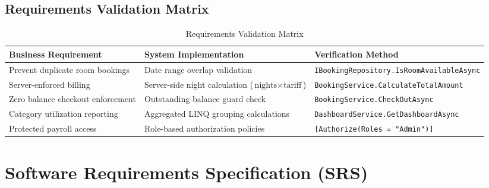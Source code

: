 \documentclass[11pt,a4paper]{article}
\begin{document}
\subsection{Requirements Validation Matrix}
\begin{table}[H]
\centering
\caption{Requirements Validation Matrix}
\label{tab:req_matrix}
\begin{tabularx}{\textwidth}{p{4.2cm} X p{4.2cm}}
\toprule
\textbf{Business Requirement} & \textbf{System Implementation} & \textbf{Verification Method} \\
\midrule
Prevent duplicate room bookings & Date range overlap validation & \texttt{IBookingRepository.IsRoomAvailableAsync} \\
Server-enforced billing & Server-side night calculation ($\text{nights} \times \text{tariff}$) & \texttt{BookingService.CalculateTotalAmount} \\
Zero balance checkout enforcement & Outstanding balance guard check & \texttt{BookingService.CheckOutAsync} \\
Category utilization reporting & Aggregated LINQ grouping calculations & \texttt{DashboardService.GetDashboardAsync} \\
Protected payroll access & Role-based authorization policies & \texttt{[Authorize(Roles = "Admin")]} \\
\bottomrule
\end{tabularx}
\end{table}

\section{Software Requirements Specification (SRS)}
\end{document}
